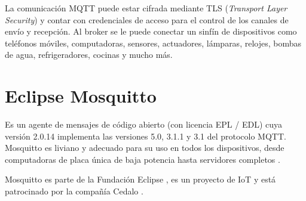 \begin{itemize}

La comunicación MQTT puede estar cifrada mediante TLS (\emph{Transport Layer Security}) y contar con credenciales de acceso para el control de los canales de envío y recepción. Al broker se le puede conectar un sinfín de dispositivos como teléfonos móviles, computadoras, sensores, actuadores, lámparas, relojes, bombas de agua, refrigeradores, cocinas y mucho más. 

\end{itemize}





\section{Eclipse Mosquitto} 
Es un agente de mensajes de código abierto (con licencia EPL / EDL) cuya versión 2.0.14 implementa las versiones 5.0, 3.1.1 y 3.1 del protocolo MQTT. Mosquitto es liviano y adecuado para su uso en todos los dispositivos, desde computadoras de placa única de baja potencia hasta servidores completos \citep{WEBSITE:5}.


Mosquitto es parte de la Fundación Eclipse \citep{WEBSITE:5}, es un proyecto de IoT \citep{WEBSITE:39} y está patrocinado por la compañía Cedalo \citep{WEBSITE:40}. 

